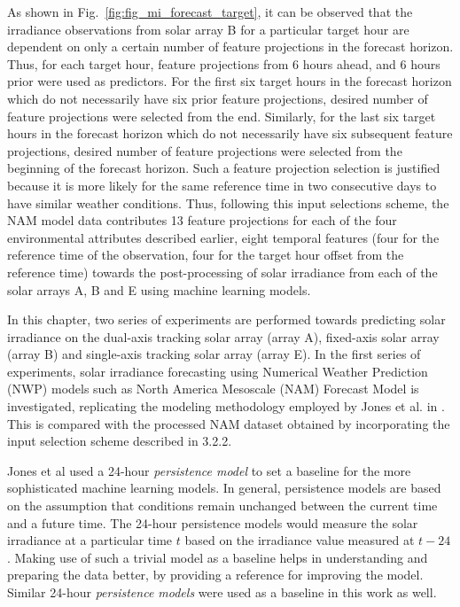 \par As shown in Fig.~\ref{fig:fig_mi_forecast_target}, it can be observed that the irradiance observations from solar array B for a particular target hour are dependent on only a certain number of feature projections in the forecast horizon. Thus, for each target hour, feature projections from 6 hours ahead, and 6 hours prior were used as predictors. For the first six target hours in the forecast horizon which do not necessarily have six prior feature projections, desired number of feature projections were selected from the end. Similarly, for the last six target hours in the forecast horizon which do not necessarily have six subsequent feature projections, desired number of feature projections were selected from the beginning of the forecast horizon. Such a feature projection selection is justified because it is more likely for the same reference time in two consecutive days to have similar weather conditions. Thus, following this input selections scheme, the NAM model data contributes 13 feature projections for each of the four environmental attributes described earlier, eight temporal features (four for the reference time of the observation, four for the target hour offset from the reference time) towards the post-processing of solar irradiance from each of the solar arrays A, B and E using machine learning models.

\par In this chapter, two series of experiments are performed towards predicting solar irradiance on the dual-axis tracking solar array (array A), fixed-axis solar array (array B) and single-axis tracking solar array (array E). In the first series of experiments, solar irradiance forecasting using Numerical Weather Prediction (NWP) models such as North America Mesoscale (NAM) Forecast Model is investigated, replicating the modeling methodology employed by Jones et al. in \cite{thesis_zach}. This is compared with the processed NAM dataset obtained by incorporating the input selection scheme described in 3.2.2. 

\par Jones et al used a 24-hour \textit{persistence model} to set a baseline for the more sophisticated machine learning models. In general, persistence models are based on the assumption that conditions remain unchanged between the current time and a future time. The 24-hour persistence models would measure the solar irradiance at a particular time $t$ based on the irradiance value measured at $t-24$. Making use of such a trivial model as a baseline helps in understanding and preparing the data better, by providing a reference for improving the model. Similar 24-hour \textit{persistence models} were used as a baseline in this work as well.

